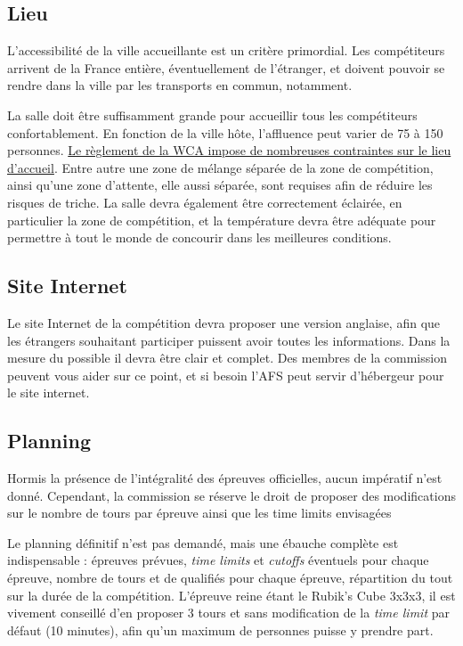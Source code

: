 \documentclass[a4paper,12pt]{scrartcl}
\begin{document}
\subsection*{Lieu}


L’accessibilité de la ville accueillante est un critère primordial. Les compétiteurs arrivent de la France entière, éventuellement de l’étranger, et doivent pouvoir se rendre dans la ville par les transports en commun, notamment.


La salle doit être suffisamment grande pour accueillir tous les compétiteurs confortablement.
En fonction de la ville hôte, l’affluence peut varier de 75 à 150 personnes. 
\href{https://www.worldcubeassociation.org/regulations/translations/french/#article-7-environment}{Le règlement de la WCA impose de nombreuses contraintes sur le lieu d'accueil}.
Entre autre une zone de mélange séparée de la zone de compétition, ainsi qu’une zone d’attente, elle aussi séparée, sont requises afin de réduire les risques de triche.
La salle devra également être correctement éclairée, en particulier la zone de compétition, et la température devra être adéquate pour permettre à tout le monde de concourir dans les meilleures conditions.

\subsection*{Site Internet}


Le site Internet de la compétition devra proposer une version anglaise, afin que
les étrangers souhaitant participer puissent avoir toutes les informations.
Dans la mesure du possible il devra être clair et complet. Des membres de la
commission peuvent vous aider sur ce point, et si besoin l'AFS peut servir
d'hébergeur pour le site internet.

\subsection*{Planning}

Hormis la présence de l’intégralité des épreuves officielles, aucun impératif n’est donné.
Cependant, la commission se réserve le droit de proposer des modifications sur le
nombre de tours par épreuve ainsi que les time limits envisagées

Le planning définitif n’est pas demandé, mais une ébauche complète est indispensable :
épreuves prévues, \emph{time limits} et \emph{cutoffs} éventuels pour chaque
épreuve, nombre de tours et de qualifiés pour chaque épreuve, répartition du
tout sur la durée de la compétition. L’épreuve reine étant le Rubik’s Cube 3x3x3,
il est vivement conseillé d’en proposer 3 tours et sans modification de la
\emph{time limit} par défaut (10 minutes), afin qu'un maximum de personnes puisse
y prendre part.
\end{document}
